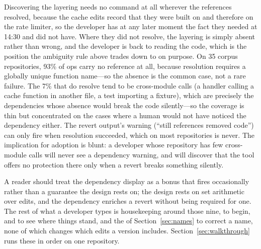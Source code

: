 Discovering the
layering needs no command at all wherever the references resolved, because the cache
edits record that they were built on  and therefore on the rate
limiter, so the developer has at any later moment the fact they needed at 14:30 and
did not have. Where they did not resolve, the layering is simply absent rather than wrong, and the
developer is back to reading the code, which is the position the ambiguity rule
above trades down to on purpose. On 35 corpus repositories, 93\% of ops carry no
reference at all, because resolution requires a globally unique function name---so
the absence is the common case, not a rare failure. The 7\% that do resolve tend to
be cross-module calls (a handler calling a cache function in another file, a test
importing a fixture), which are precisely the dependencies whose absence would break
the code silently---so the coverage is thin but concentrated on the cases where a
human would not have noticed the dependency either. The revert output's warning
(``still references removed code'') can only fire when resolution succeeded, which
on most repositories is never. The implication for adoption is blunt: a developer
whose repository has few cross-module calls will never see a dependency warning,
and will discover that the tool offers no protection there only when a revert
breaks something silently.

A reader should treat the dependency display as a bonus that fires
occasionally rather than a guarantee the design rests on; the design rests on set
arithmetic over edits, and the dependency enriches a revert without being required
for one. The rest of
what a developer types is housekeeping around those nine,  to begin,
 and  to see where things stand, and the
 of Section~\ref{sec:names} to correct a name, none of which
changes which edits a version includes. Section~\ref{sec:walkthrough} runs these in
order on one repository.
